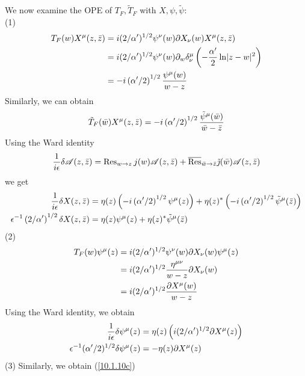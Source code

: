 \begin{tcolorbox}[breakable]
	\noindent We now examine the OPE of $T_{F},\tilde{T}_{F}$ with $X,\psi ,\tilde{\psi}$: \\
	(1)
	\begin{align*}
		T_{F}(w)X^{\mu }(z,\bar{z}) &=i(2/\alpha ^{\prime })^{1/2}\psi ^{\nu
		}(w)\partial X_{\nu }(w)X^{\mu }(z,\bar{z}) \\
		&=i(2/\alpha ^{\prime })^{1/2}\psi ^{\nu }(w)\partial _{w}\delta _{\nu
		}^{\mu }\left( -\frac{\alpha ^{\prime }}{2}\ln \lvert z-w\rvert
		^{2}\right)  \\
		&=-i\left( \alpha ^{\prime }/2\right) ^{1/2}\frac{\psi ^{\mu }(w)}{w-z}
	\end{align*}%
	Similarly, we can obtain \[
	\tilde{T}_{F}(\bar{w})X^{\mu }(z,\bar{z})=-i\left( \alpha ^{\prime
	}/2\right) ^{1/2}\frac{\tilde{\psi}^{\mu }(\bar{w})}{\bar{w}-\bar{z}}
	\]%
	Using the Ward identity \[
	\frac{1}{\mi\epsilon }\delta \mathscr{A}(z,\bar{z})=\operatorname{Res}_{w\rightarrow z}j(w)\mathscr{A}(z,%
	\bar{z})+\overline{\operatorname{Res}}_{\bar{w}\rightarrow \bar{z}}\tilde{\jmath}(\bar{w})\mathscr{A}(z,\bar{z}%
	)
	\]%
	we get \begin{align*}
		\frac{1}{\mi\epsilon }\delta X(z,\bar{z}) &=\eta (z)\left( -\mi\left( \alpha
		^{\prime }/2\right) ^{1/2}\psi ^{\mu }(z)\right) +\eta (z)^{\ast }\left(
		-\mi\left( \alpha ^{\prime }/2\right) ^{1/2}\tilde{\psi}^{\mu }(\bar{z}%
		)\right)  \\
		\epsilon ^{-1}\left( 2/\alpha ^{\prime }\right) ^{1/2}\delta X(z,\bar{z})
		&=\eta (z)\psi ^{\mu }(z)+\eta (z)^{\ast }\tilde{\psi}^{\mu }(\bar{z})
	\end{align*}%
	(2) %
	\begin{align*}
		T_{F}(w)\psi ^{\mu }(z) &=i(2/\alpha ^{\prime })^{1/2}\psi ^{\nu
		}(w)\partial X_{\nu }(w)\psi ^{\mu }(z) \\
		&=i(2/\alpha ^{\prime })^{1/2}\frac{\eta ^{\mu \nu }}{w-z}\partial X_{\nu
		}(w) \\
		&=i(2/\alpha ^{\prime })^{1/2}\frac{\partial X^{\mu }(w)}{w-z}
	\end{align*}%
	Using the Ward identity, we obtain \begin{align*}
		\frac{1}{i\epsilon }\delta \psi ^{\mu }(z) &=\eta (z)\left( i(2/\alpha
		^{\prime })^{1/2}\partial X^{\mu }(z)\right)  \\
		\epsilon ^{-1}(\alpha ^{\prime }/2)^{1/2}\delta \psi ^{\mu }(z) &=-\eta
		(z)\partial X^{\mu }(z)
	\end{align*}%
	(3) Similarly, we obtain (\ref{10.1.10c})
\end{tcolorbox}


